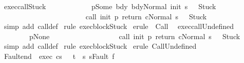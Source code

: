 \begin{isabellebody}
\isamarkupfalse%
%
\endisatagproof
{\isafoldproof}%
%
\isadelimproof
\isanewline
%
\endisadelimproof
\isanewline
{}\isamarkupfalse%
\ exec{\isacharunderscore}callStuck{\isacharcolon}\ \isanewline
\ \ \ \ \ \ \ \ \ \ {\isachardoublequoteopen}{\isasymlbrakk}{\isasymGamma}\ p{\isacharequal}Some\ bdy{\isacharsemicolon}\ {\isasymGamma}{\isasymturnstile}{\isasymlangle}bdy{\isacharcomma}Normal\ {\isacharparenleft}init\ s{\isacharparenright}{\isasymrangle}\ {\isasymRightarrow}\ \ Stuck{\isasymrbrakk}\ \isanewline
\ \ \ \ \ \ \ \ \ \ \ {\isasymLongrightarrow}\ \isanewline
\ \ \ \ \ \ \ \ \ \ \ {\isasymGamma}{\isasymturnstile}{\isasymlangle}call\ init\ p\ return\ c{\isacharcomma}Normal\ s{\isasymrangle}\ {\isasymRightarrow}\ \ Stuck{\isachardoublequoteclose}\isanewline
%
\isadelimproof
%
\endisadelimproof
%
\isatagproof
{}\isamarkupfalse%
\ {\isacharparenleft}simp\ add{\isacharcolon}\ call{\isacharunderscore}def{\isacharparenright}\isanewline
{}\isamarkupfalse%
\ {\isacharparenleft}rule\ exec{\isacharunderscore}blockStuck{\isacharparenright}\isanewline
{}\isamarkupfalse%
\ {\isacharparenleft}erule\ {\isacharparenleft}{}{\isacharparenright}\ Call{\isacharparenright}\isanewline
{}\isamarkupfalse%
%
\endisatagproof
{\isafoldproof}%
%
\isadelimproof
\isanewline
%
\endisadelimproof
\isanewline
{}\isamarkupfalse%
\ \ exec{\isacharunderscore}callUndefined{\isacharcolon}\ \isanewline
\ \ \ \ \ \ \ {\isachardoublequoteopen}{\isasymlbrakk}{\isasymGamma}\ p{\isacharequal}None{\isasymrbrakk}\ \isanewline
\ \ \ \ \ \ \ \ {\isasymLongrightarrow}\ \isanewline
\ \ \ \ \ \ \ \ {\isasymGamma}{\isasymturnstile}{\isasymlangle}call\ init\ p\ return\ c{\isacharcomma}Normal\ s{\isasymrangle}\ {\isasymRightarrow}\ \ Stuck{\isachardoublequoteclose}\isanewline
%
\isadelimproof
%
\endisadelimproof
%
\isatagproof
{}\isamarkupfalse%
\ {\isacharparenleft}simp\ add{\isacharcolon}\ call{\isacharunderscore}def{\isacharparenright}\isanewline
{}\isamarkupfalse%
\ {\isacharparenleft}rule\ exec{\isacharunderscore}blockStuck{\isacharparenright}\isanewline
{}\isamarkupfalse%
\ {\isacharparenleft}erule\ CallUndefined{\isacharparenright}\isanewline
{}\isamarkupfalse%
%
\endisatagproof
{\isafoldproof}%
%
\isadelimproof
\isanewline
%
\endisadelimproof
\isanewline
\isanewline
{}\isamarkupfalse%
\ Fault{\isacharunderscore}end{\isacharcolon}\ \ exec{\isacharcolon}\ {\isachardoublequoteopen}{\isasymGamma}{\isasymturnstile}{\isasymlangle}c{\isacharcomma}s{\isasymrangle}\ {\isasymRightarrow}\ \ t{\isachardoublequoteclose}\ \ s{\isacharcolon}\ {\isachardoublequoteopen}s{\isacharequal}Fault\ f{\isachardoublequoteclose}\ \isanewline

\end{isabellebody}
